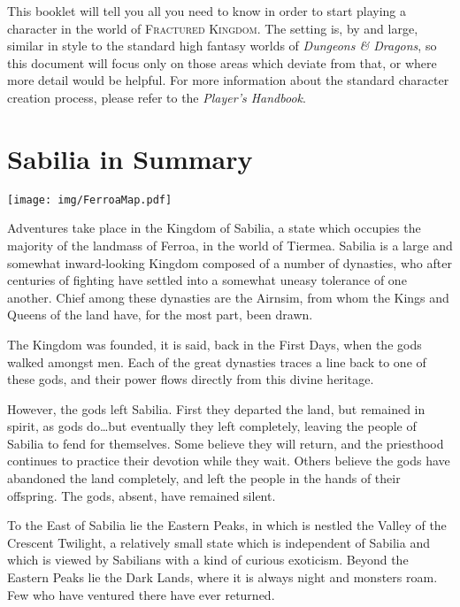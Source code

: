 \documentclass[10pt,twoside,openright,a4paper,twocolumn]{book}
\begin{document}
This booklet will tell you all you need to know in order to start playing a
character in the world of \textsc{Fractured Kingdom}.  The setting is, by and
large, similar in style to the standard high fantasy worlds of \textit{Dungeons
\& Dragons}, so this document will focus only on those areas which deviate from
that, or where more detail would be helpful.  For more information about the
standard character creation process, please refer to the \textit{Player's
Handbook}.

\section{Sabilia in Summary}

\begin{figure*}[h]
  \texttt{[image: img/FerroaMap.pdf]}
\end{figure*}

Adventures take place in the Kingdom of Sabilia, a state which occupies the
majority of the landmass of Ferroa, in the world of Tiermea.  Sabilia is a
large and somewhat inward-looking Kingdom composed of a number of dynasties,
who after centuries of fighting have settled into a somewhat uneasy tolerance
of one another.  Chief among these dynasties are the Airnsim, from whom the
Kings and Queens of the land have, for the most part, been drawn.

The Kingdom was founded, it is said, back in the First Days, when the gods
walked amongst men.  Each of the great dynasties traces a line back to one
of these gods, and their power flows directly from this divine heritage.

However, the gods left Sabilia.  First they departed the land, but remained in
spirit, as gods do\dots but eventually they left completely, leaving the people
of Sabilia to fend for themselves.  Some believe they will return, and the
priesthood continues to practice their devotion while they wait.  Others
believe the gods have abandoned the land completely, and left the people in the
hands of their offspring.  The gods, absent, have remained silent.

To the East of Sabilia lie the Eastern Peaks, in which is nestled the Valley of
the Crescent Twilight, a relatively small state which is independent of Sabilia
and which is viewed by Sabilians with a kind of curious exoticism.  Beyond the
Eastern Peaks lie the Dark Lands, where it is always night and monsters roam.
Few who have ventured there have ever returned.
\end{document}
